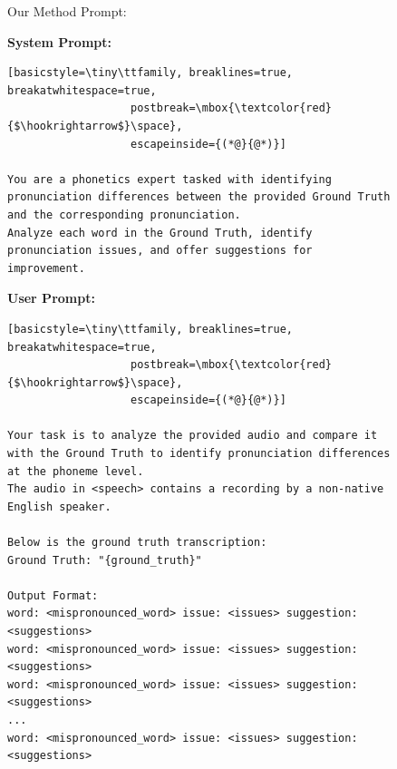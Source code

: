 \documentclass[11pt]{article}
\begin{document}
\begin{figure}[ht]
\begin{AIBox}{Our Method Prompt:}

\begin{minipage}[t]{\textwidth}
{\bf System Prompt:} \scriptsize
\begin{lstlisting}[basicstyle=\tiny\ttfamily, breaklines=true, breakatwhitespace=true,
                   postbreak=\mbox{\textcolor{red}{$\hookrightarrow$}\space},
                   escapeinside={(*@}{@*)}]

You are a phonetics expert tasked with identifying pronunciation differences between the provided Ground Truth and the corresponding pronunciation. 
Analyze each word in the Ground Truth, identify pronunciation issues, and offer suggestions for improvement.
\end{lstlisting}
\end{minipage}

\tcbline


\begin{minipage}[t]{\textwidth}
{\bf User Prompt:} \scriptsize
\begin{lstlisting}[basicstyle=\tiny\ttfamily, breaklines=true, breakatwhitespace=true,
                   postbreak=\mbox{\textcolor{red}{$\hookrightarrow$}\space},
                   escapeinside={(*@}{@*)}]

Your task is to analyze the provided audio and compare it with the Ground Truth to identify pronunciation differences at the phoneme level.
The audio in <speech> contains a recording by a non-native English speaker. 

Below is the ground truth transcription:
Ground Truth: "{ground_truth}"

Output Format:
word: <mispronounced_word> issue: <issues> suggestion: <suggestions>
word: <mispronounced_word> issue: <issues> suggestion: <suggestions>
word: <mispronounced_word> issue: <issues> suggestion: <suggestions>
...
word: <mispronounced_word> issue: <issues> suggestion: <suggestions>


\end{lstlisting}
\end{minipage}
\end{AIBox}
\end{figure}
\end{document}
